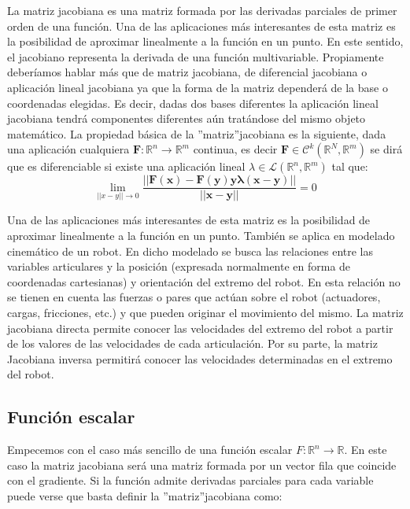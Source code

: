 \documentclass[10pt]{article}
\begin{document}
La matriz jacobiana es una matriz formada por las derivadas parciales de primer orden de una función. Una de las aplicaciones más interesantes de esta matriz es la posibilidad de aproximar linealmente a la función en un punto. En este sentido, el jacobiano representa la derivada de una función multivariable. Propiamente  deberíamos  hablar  más  que  de  matriz  jacobiana,  de  diferencial  jacobiana  o  aplicación lineal  jacobiana  ya  que  la  forma  de  la  matriz  dependerá de  la  base  o  coordenadas  elegidas.  Es  decir, dadas  dos  bases  diferentes  la  aplicación  lineal  jacobiana  tendrá  componentes  diferentes  aún  tratándose del  mismo  objeto  matemático.  La  propiedad  básica  de  la  ”matriz”jacobiana  es  la  siguiente,  dada  una aplicación  cualquiera $\mathbf{F} \colon \mathbb{R}^n \rightarrow \mathbb{R}^m$ continua, es decir $\mathbf{F} \in \mathcal{C}^k(\mathbb{R}^N,\mathbb{R}^m)$ se dirá que es diferenciable si existe una aplicación lineal $\lambda \in \mathcal{L}(\mathbb{R}^n,\mathbb{R}^m)$ tal que:
\begin{equation}
\lim\limits_{||x-y|| \to 0}\frac{||\mathbf{F(x) - F(y) y \lambda(x-y)||}}{\mathbf{||x-y||}}=0
\end{equation}

Una  de  las  aplicaciones  más  interesantes  de  esta  matriz  es  la  posibilidad  de  aproximar  linealmente a  la  función  en  un  punto.  También  se  aplica  en  modelado  cinemático  de  un  robot.  En  dicho  modelado se busca las relaciones entre las variables articulares y la posición (expresada normalmente en forma de coordenadas  cartesianas)  y  orientación  del  extremo  del  robot.  En  esta  relación  no  se  tienen  en  cuenta las fuerzas o pares que actúan sobre el robot (actuadores, cargas, fricciones, etc.) y que pueden originar el movimiento del mismo. La matriz jacobiana directa permite conocer las velocidades del extremo del robot  a  partir  de  los  valores  de  las  velocidades  de  cada  articulación.  Por  su  parte,  la  matriz  Jacobiana inversa permitirá conocer las velocidades determinadas en el extremo del robot.

\subsection{Función escalar}

Empecemos con el caso más sencillo de una función escalar $F \colon \mathbb{R}^n \rightarrow \mathbb{R}$. En  este  caso  la  matriz jacobiana será una matriz formada por un vector fila que coincide con el gradiente. Si la función admite derivadas parciales para cada variable puede verse que basta definir la ”matriz”jacobiana como:
\end{document}
